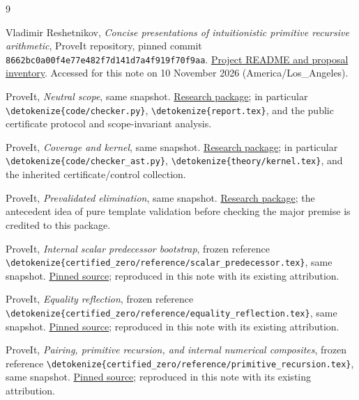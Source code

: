 \documentclass[11pt,letterpaper]{article}
\theoremstyle{definition}
\theoremstyle{remark}
\newcommand{\file}[1]{\expandafter\nolinkurl\expandafter{\detokenize{#1}}}
\begin{document}
\clearpage
\begin{thebibliography}{9}
\raggedright
{}
Vladimir Reshetnikov, \emph{Concise presentations of intuitionistic primitive
recursive arithmetic}, ProveIt repository, pinned commit
\texttt{8662bc0a00f4e77e482f7d141d7a4f919f70f9aa}.
\href{https://github.com/VladimirReshetnikov/ProveIt/blob/8662bc0a00f4e77e482f7d141d7a4f919f70f9aa/Logic/PrimitiveRecursiveArithmetic/ConciseIPRA/README.md}{Project README and proposal inventory}.
Accessed for this note on 10 November 2026 (America/Los\_Angeles).

ProveIt, \emph{Neutral scope}, same snapshot.
\href{https://github.com/VladimirReshetnikov/ProveIt/tree/8662bc0a00f4e77e482f7d141d7a4f919f70f9aa/Logic/PrimitiveRecursiveArithmetic/ConciseIPRA/Research/neutral_scope}{Research package};
in particular \file{code/checker.py}, \file{report.tex}, and the public
certificate protocol and scope-invariant analysis.

ProveIt, \emph{Coverage and kernel}, same snapshot.
\href{https://github.com/VladimirReshetnikov/ProveIt/tree/8662bc0a00f4e77e482f7d141d7a4f919f70f9aa/Logic/PrimitiveRecursiveArithmetic/ConciseIPRA/Research/coverage_and_kernel}{Research package};
in particular \file{code/checker_ast.py}, \file{theory/kernel.tex}, and the
inherited certificate/control collection.

ProveIt, \emph{Prevalidated elimination}, same snapshot.
\href{https://github.com/VladimirReshetnikov/ProveIt/tree/8662bc0a00f4e77e482f7d141d7a4f919f70f9aa/Logic/PrimitiveRecursiveArithmetic/ConciseIPRA/Research/prevalidated_elimination}{Research package};
the antecedent idea of pure template validation before checking the major
premise is credited to this package.

ProveIt, \emph{Internal scalar predecessor bootstrap}, frozen reference
\file{certified_zero/reference/scalar_predecessor.tex}, same snapshot.
\href{https://github.com/VladimirReshetnikov/ProveIt/blob/8662bc0a00f4e77e482f7d141d7a4f919f70f9aa/Logic/PrimitiveRecursiveArithmetic/ConciseIPRA/Research/certified_zero/reference/scalar_predecessor.tex}{Pinned source}; reproduced in this note with its existing attribution.

ProveIt, \emph{Equality reflection}, frozen reference
\file{certified_zero/reference/equality_reflection.tex}, same snapshot.
\href{https://github.com/VladimirReshetnikov/ProveIt/blob/8662bc0a00f4e77e482f7d141d7a4f919f70f9aa/Logic/PrimitiveRecursiveArithmetic/ConciseIPRA/Research/certified_zero/reference/equality_reflection.tex}{Pinned source}; reproduced in this note with its existing attribution.

ProveIt, \emph{Pairing, primitive recursion, and internal numerical composites},
frozen reference \file{certified_zero/reference/primitive_recursion.tex},
same snapshot.
\href{https://github.com/VladimirReshetnikov/ProveIt/blob/8662bc0a00f4e77e482f7d141d7a4f919f70f9aa/Logic/PrimitiveRecursiveArithmetic/ConciseIPRA/Research/certified_zero/reference/primitive_recursion.tex}{Pinned source}; reproduced in this note with its existing attribution.
\end{thebibliography}
\end{document}

